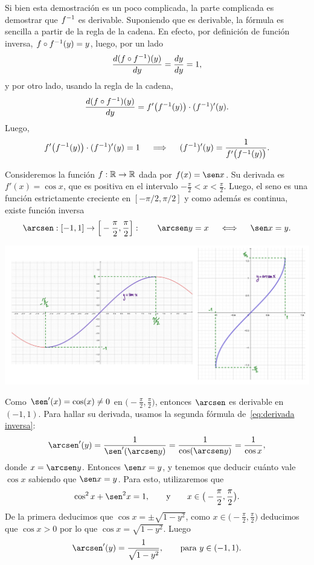 Si bien esta demostración es un poco complicada, la parte complicada es demostrar que $f^{-1}$ es derivable. Suponiendo que es derivable, la fórmula es sencilla a partir de la regla de la cadena. En efecto, por definición de función inversa, $f\circ f^{-1}(y) = y$, luego, por un lado
\[
\frac{d (f\circ f^{-1})(y)}{dy} = \frac{dy}{dy} = 1,
\]
y por otro lado, usando la regla de la cadena,
\[
    \frac{d (f\circ f^{-1})(y)}{dy} = f'\big(f^{-1}(y)\big)\cdot (f^{-1})'(y).
\]
Luego,
\[
    f'\big(f^{-1}(y)\big)\cdot (f^{-1})'(y)=1
    \quad\implies\quad  (f^{-1})'(y)= \frac1{f'\big(f^{-1}(y)\big)}.
\]

\begin{example}
    Consideremos la función $f:\mathbb{R}\to\mathbb{R}$ dada por $f(x)=\sen x$. 
    Su derivada es $f'(x)=\cos x$, que es positiva en el intervalo $-\frac\pi2<x<\frac\pi2$.
    Luego, el seno es una función estrictamente creciente en $[-\pi/2,\pi/2]$ y como además es continua, existe función inversa 
    \[
    \arcsen: [-1,1] \to \Big[-\frac\pi2,\frac\pi2\Big]:
    \qquad
    \arcsen y = x \quad\iff\quad \sen x = y.
    \]

    \centerline{\includegraphics[width=.8\textwidth]{pics/seno-arcseno.jpeg}}
    
    Como $\sen'(x)=\cos(x)\neq 0$ en $\big(-\frac\pi2,\frac\pi2\big)$, entonces $\arcsen$ es derivable en $(-1,1)$.
    Para hallar su derivada, usamos la segunda fórmula de~\eqref{eq:derivada inversa}:
    \[
    \arcsen'(y) = \frac{1}{\sen'(\arcsen y)}
    = \frac1{\cos(\arcsen y)} = \frac1{\cos x},
    \]
    donde $x=\arcsen y$. Entonces $\sen x=y$, y tenemos que deducir cuánto vale $\cos x$ sabiendo que $\sen x = y$. Para esto, utilizaremos que
    \[
    \cos^2 x + \sen^2 x = 1,\qquad\text{y}\qquad x\in\big(-\frac\pi2,\frac\pi2\big).
    \]
    De la primera deducimos que $\cos x = \pm \sqrt{1-y^2}$, como $x\in\big(-\frac\pi2,\frac\pi2\big)$ deducimos que $\cos x > 0$ por lo que $\cos x = \sqrt{1-y^2}$. Luego
    \[
    \arcsen'(y) = \frac1{\sqrt{1-y^2}}, \qquad \text{para $y\in (-1,1)$}.
    \]
\end{example}

